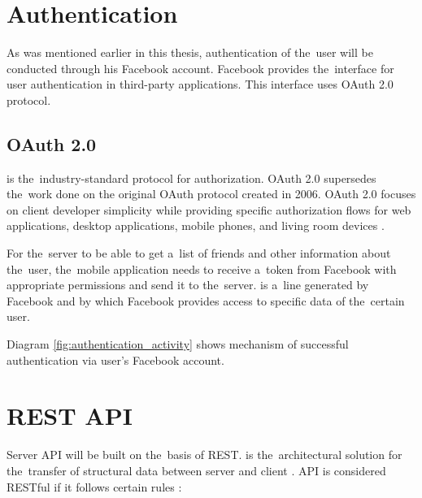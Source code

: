 \section{Authentication}
As was mentioned earlier in this thesis, authentication of the~user will be conducted through his Facebook account.
Facebook provides the~interface for user authentication in third-party applications. This interface uses OAuth 2.0 protocol.

\subsection{OAuth 2.0}
 is the~industry-standard protocol for authorization. OAuth 2.0 supersedes the~work done on
the original OAuth protocol created in 2006. OAuth 2.0 focuses on client developer simplicity while providing specific
autho\-rization flows for web applications, desktop applications, mobile phones, and living room devices \cite{oauth}.

For the~server to be able to get a~list of friends and other information about the~user, the~mobile application needs
to receive a~token from Facebook with appropriate permissions and send it to the~server.  is a~line
generated by Facebook and by which Facebook provides access to specific data of the~certain user.

Diagram \ref{fig:authentication_activity} shows mechanism of successful authentication via user's Facebook account.


\newcommand{\ritem}[1]{
    \item \textbf{#1} \par
}
\section{REST API}

Server API will be built on the~basis of \ac{REST}.  is the~architectural solution for
the~transfer of structural data between server and client \cite{rest}. API is considered RESTful if it follows certain
rules \cite{whatisrest}:

